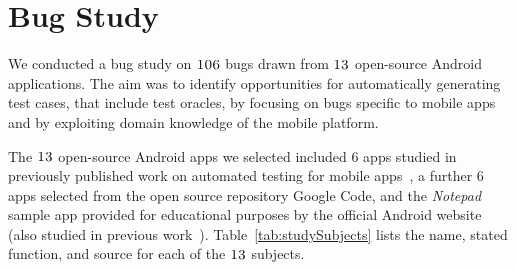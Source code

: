 \section{Bug Study}
\label{study}


We conducted a bug study on $\textsc{106}$ bugs drawn from $\textsc{13}$ open-source Android applications. The aim was to identify opportunities for automatically generating test cases, that include test oracles, by focusing on bugs specific to mobile apps and by exploiting domain knowledge of the mobile platform.

The $\textsc{13}$ open-source Android apps we selected %
included $6$ apps studied in previously published work on automated testing for mobile apps~\cite{Hu:2011:AST,AmalfitanoASE2012,Nguyen:2012:ISSTA}, a further $6$ apps selected from the open source repository Google Code, and the \textit{Notepad} sample app provided for educational purposes by the official Android website (also studied in previous work~\cite{Nguyen:2012:ISSTA}). Table~\ref{tab:studySubjects} lists the name, stated function, and source for each of the $\textsc{13}$ subjects.


